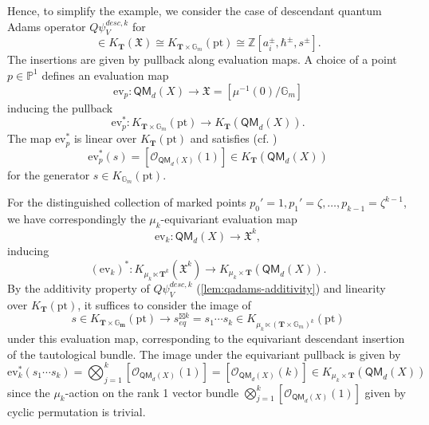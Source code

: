\documentclass[reqno]{amsart}
\numberwithin{equation}{section}
\numberwithin{equation}{section}
\numberwithin{equation}{section}
\theoremstyle{definition}
\theoremstyle{remark}
\theoremstyle{remark}
\begin{document}
Hence, to simplify the example, we consider the case of descendant quantum Adams operator $Q\psi^{desc, k}_V$ for
\begin{equation}
    [V] \in K_{\mathbf{T}} \left( \mathfrak{X} \right) \cong K_{\mathbf{T} \times \mathbb{G}_m} (\mathrm{pt}) \cong \mathbb{Z} [a_{i}^\pm , \hbar^{\pm}, s^{\pm}].  
\end{equation}
The insertions are given by pullback along evaluation maps. A choice of a point $p \in \mathbb{P}^1$ defines an evaluation map
\begin{equation}
    \mathrm{ev}_p : \mathsf{QM}_d(X) \to \mathfrak{X} = \left[\mu^{-1}(0) / \mathbb{G}_m \right]
\end{equation}
inducing the pullback
\begin{equation}
    \mathrm{ev}^*_p : K_{\mathbf{T} \times \mathbb{G}_m} (\mathrm{pt}) \to K_{\mathbf{T}}(\mathsf{QM}_d(X)).
\end{equation}
The map $\mathrm{ev}_p^*$ is linear over $K_{\mathbf{T}}(\mathrm{pt})$ and satisfies (cf. \cite[Lemma 3.21]{Lee23a})
\begin{equation}
    \mathrm{ev}^*_p (s) = [\mathcal{O}_{\mathsf{QM}_d(X)}(1)] \in K_{\mathbf{T}}(\mathsf{QM}_d(X))
\end{equation}
for the generator $s \in K_{\mathbb{G}_m}(\mathrm{pt})$. 

For the distinguished collection of marked points $p_0' = 1, p_1' = \zeta, \dots, p_{k-1} = \zeta^{k-1}$, we have correspondingly the $\mu_k$-equivariant evaluation map
\begin{equation}
    \mathrm{ev}_k: \mathsf{QM}_d(X) \to \mathfrak{X}^k,
\end{equation}
inducing
\begin{equation}
    (\mathrm{ev}_k)^*: K_{\mu_k \ltimes \mathbf{T}^k} (\mathfrak{X}^k)  \to K_{\mu_k \times \mathbf{T}} (\mathsf{QM}_d(X)).
\end{equation}
By the additivity property of $Q\psi_V^{desc,k}$ (\cref{lem:qadams-additivity}) and linearity over $K_\mathbf{T}(\mathrm{pt})$, it suffices to consider the image of
\begin{equation}
    s \in K_\mathbf{T \times \mathbb{G}_m} (\mathrm{pt}) \to s_{eq}^{\boxtimes k} = s_1 \cdots s_k\in K_{\mu_k \ltimes (\mathbf{T} \times \mathbb{G}_m)^k} (\mathrm{pt})
\end{equation}
under this evaluation map, corresponding to the equivariant descendant insertion of the tautological bundle. The image under the equivariant pullback is given by
\begin{equation}
    \mathrm{ev}_k^* (s_1 \cdots s_k) = \bigotimes_{j=1}^k [\mathcal{O}_{\mathsf{QM}_d(X)}(1)] = [\mathcal{O}_{\mathsf{QM}_d(X)}(k)]  \in K_{\mu_k \times \mathbf{T}}(\mathsf{QM}_d(X))
\end{equation}
since the $\mu_k$-action on the rank 1 vector bundle $\bigotimes_{j=1}^k [\mathcal{O}_{\mathsf{QM}_d(X)}(1)] $ given by cyclic permutation is trivial.
\end{document}
